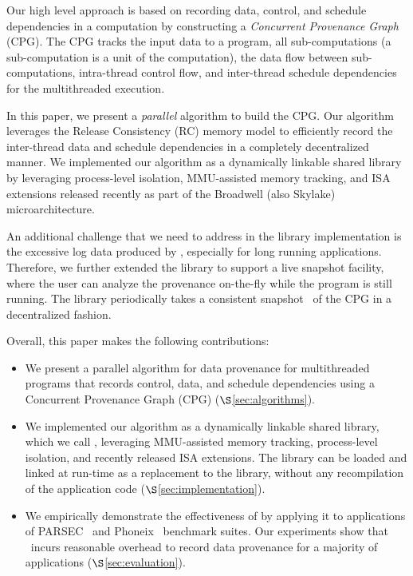 Our high level approach is based on recording data, control, and schedule dependencies in a computation by constructing a {\em Concurrent Provenance Graph} (CPG). The CPG tracks the input data to a program, all sub-computations (a sub-computation is a unit of the computation), the data flow between sub-computations, intra-thread control flow, and inter-thread schedule dependencies for the multithreaded execution. 


In this paper, we present a {\em parallel} algorithm to build the CPG. Our algorithm leverages the Release Consistency (RC) memory model to efficiently record the inter-thread data and schedule dependencies in a completely decentralized manner. We implemented our algorithm as a dynamically linkable shared library by leveraging process-level isolation, MMU-assisted memory tracking, and \intelpt ISA extensions released recently as part of the Broadwell (also Skylake) microarchitecture. 

An additional challenge that we need to address in the library implementation is the excessive log data produced by \intelpt, especially for long running applications. Therefore, we further extended the library to support a live snapshot facility, where the user can analyze the provenance on-the-fly while the program is still running. The library periodically takes a consistent snapshot~\cite{chandy-lamport} of the CPG in a decentralized fashion.


Overall, this paper makes the following contributions:
\begin{itemize}

\item We present a parallel algorithm for data provenance for multithreaded programs that records control, data, and schedule dependencies using a Concurrent Provenance Graph (CPG) ($\S$\ref{sec:algorithms}).

\item We implemented our algorithm as a dynamically linkable shared library, which we call \projecttitle, leveraging MMU-assisted memory tracking, process-level isolation, and recently released \intelpt ISA extensions.  The \projecttitle library can be loaded and linked at run-time as a replacement to the \pthreads library, without any recompilation  of the application code ($\S$\ref{sec:implementation}).

\item  We  empirically demonstrate  the effectiveness of \projecttitle by applying it to applications of  PARSEC~\cite{parsec} and Phoneix~\cite{phoenix} benchmark suites. Our experiments show that \projecttitle~incurs reasonable overhead to record data provenance for a majority of applications ($\S$\ref{sec:evaluation}). 

\end{itemize}




